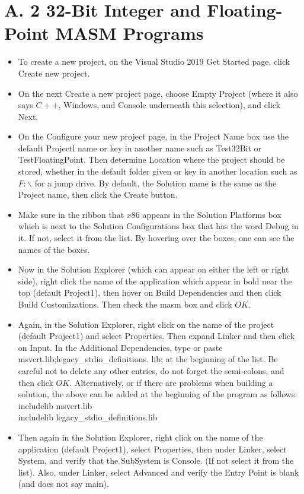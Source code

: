 \documentclass[10pt]{book}
\begin{document}
\section{A. 2 32-Bit Integer and Floating-Point MASM Programs}
\begin{itemize}
  \item To create a new project, on the Visual Studio 2019 Get Started page, click Create new project.
  \item On the next Create a new project page, choose Empty Project (where it also says $C++$, Windows, and Console underneath this selection), and click Next.
  \item On the Configure your new project page, in the Project Name box use the default Projectl name or key in another name such as Test32Bit or TestFloatingPoint. Then determine Location where the project should be stored, whether in the default folder given or key in another location such as $F: \backslash$ for a jump drive. By default, the Solution name is the same as the Project name, then click the Create button.
  \item Make sure in the ribbon that $x 86$ appears in the Solution Platforms box which is next to the Solution Configurations box that has the word Debug in it. If not, select it from the list. By hovering over the boxes, one can see the names of the boxes.
  \item Now in the Solution Explorer (which can appear on either the left or right side), right click the name of the application which appear in bold near the top (default Project1), then hover on Build Dependencies and then click Build Customizations. Then check the masm box and click $O K$.
  \item Again, in the Solution Explorer, right click on the name of the project (default Project1) and select Properties. Then expand Linker and then click on Input. In the Additional Dependencies, type or paste msvcrt.lib;legacy\_stdio\_definitions. lib; at the beginning of the list. Be careful not to delete any other entries, do not forget the semi-colons, and then click $O K$. Alternatively, or if there are problems when building a solution, the above can be added at the beginning of the program as follows:\\
includelib msvcrt.lib\\
includelib legacy\_stdio\_definitions.lib
  \item Then again in the Solution Explorer, right click on the name of the application (default Project1), select Properties, then under Linker, select System, and verify that the SubSystem is Console. (If not select it from the list). Also, under Linker, select Advanced and verify the Entry Point is blank (and does not say main).

\end{itemize}
\end{document}
